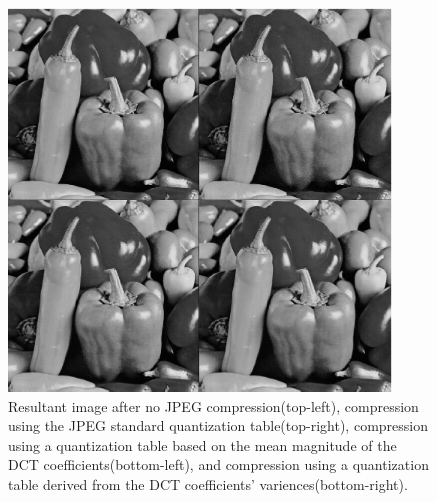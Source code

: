 \documentclass{article}
\begin{document}
\begin{figure}[H]
\centering
\includegraphics [width=4in]{lab2_03.eps}
\caption{Resultant image after no JPEG compression(top-left),
compression using the JPEG standard quantization table(top-right),
compression using a quantization table based on the mean magnitude of the DCT coefficients(bottom-left), and
compression using a quantization table derived from the DCT coefficients' variences(bottom-right).}
\label{jpgTables}
\end{figure}
\end{document}
